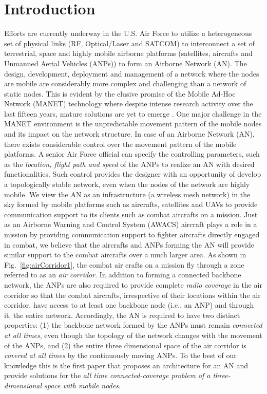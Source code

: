 \documentclass[10pt]{IEEEtran}
\begin{document}
\section{Introduction}
\label{sec:intro}
Efforts are currently underway in the U.S. Air Force to utilize a heterogeneous set of physical links (RF, Optical/Laser and SATCOM) to interconnect a set of terrestrial, space and highly mobile airborne platforms (satellites, aircrafts and Unmanned Aerial Vehicles (ANPs)) to form an Airborne Network (AN).
The design, development, deployment and management of a network where the nodes are mobile are considerably more complex and challenging than a network of static nodes. This is evident by the elusive promise of the Mobile Ad-Hoc Network (MANET) technology where despite intense research activity over the last fifteen years, mature solutions are yet to emerge \cite{Burbank06,Con07}. One major challenge in the MANET environment is the unpredictable movement pattern of the mobile nodes and its impact on the network structure. In case of an Airborne Network (AN), there exists considerable control over the movement pattern of the mobile platforms. A senior Air Force official can specify the controlling parameters, such as the {\em location, flight path and speed} of the ANPs to realize an AN with desired functionalities. Such control provides the designer with an opportunity of develop a topologically stable network, even when the nodes of the network are highly mobile. We view the AN as an infrastructure (a wireless mesh network) in the sky formed by mobile platforms such as aircrafts, satellites and UAVs to provide communication support to its clients such as combat aircrafts on a mission. Just as an Airborne Warning and Control System (AWACS) aircraft plays a role in a mission by providing communication support to fighter aircrafts directly engaged in combat, we believe that the aircrafts and ANPs forming the AN will provide similar support to the combat aircrafts over a much larger area. As shown in Fig.~\ref{fig:airCorridor1}, the combat air crafts on a mission fly through a zone referred to as an {\em air corridor}. In addition to forming a connected backbone network, the ANPs are also required to provide complete {\em radio coverage} in the air corridor so that the combat aircrafts, irrespective of their locations within the air corridor, have access to at least one backbone node (i.e., an ANP) and through it, the entire network. Accordingly, the AN is required to have two distinct properties: (1) the backbone network formed by the ANPs must remain {\em connected at all times}, even though the topology of the network changes with the movement of the ANPs, and (2) the entire three dimensional space of the air corridor is {\em covered at all times} by the continuously moving ANPs. To the best of our knowledge this is the first paper that proposes an architecture for an AN and provide solutions for the {\em all time connected-coverage problem of a three-dimensional space with mobile nodes}.
\end{document}
